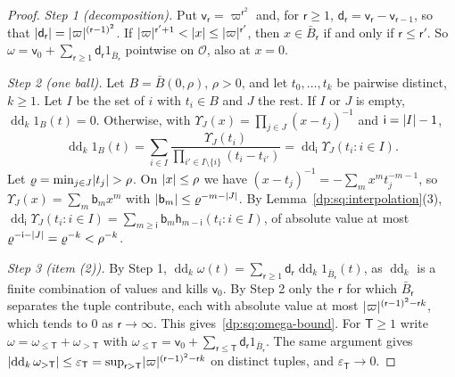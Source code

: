 \begin{proof}
\emph{Step 1 (decomposition).} Put $\mathsf v_{\mathsf r}=\varpi^{\mathsf r^2}$ and, for $\mathsf r\ge1$, $\mathsf d_{\mathsf r}=\mathsf v_{\mathsf r}-\mathsf v_{\mathsf r-1}$, so that $\lvert \mathsf d_{\mathsf r}\rvert=\lvert \varpi\rvert^{(\mathsf r-1)^2}$. If $\lvert \varpi\rvert^{\mathsf r'+1}<\lvert x\rvert\le\lvert \varpi\rvert^{\mathsf r'}$, then $x\in\bar B_{\mathsf r}$ if and only if $\mathsf r\le\mathsf r'$. So $\omega=\mathsf v_0+\sum_{\mathsf r\ge1}\mathsf d_{\mathsf r}1_{\bar B_{\mathsf r}}$ pointwise on $\mathcal O$, also at $x=0$.

\emph{Step 2 (one ball).} Let $B=\bar B(0,\rho)$, $\rho>0$, and let $t_0,\dots,t_k$ be pairwise distinct, $k\ge1$. Let $I$ be the set of $i$ with $t_i\in B$ and $J$ the rest. If $I$ or $J$ is empty, $\operatorname{dd}_k1_B(t)=0$. Otherwise, with $\Upsilon_J(x)=\prod_{j\in J}(x-t_j)^{-1}$ and $\mathsf i=\lvert I\rvert-1$,
\[
 \operatorname{dd}_k1_B(t)=\sum_{i\in I}\frac{\Upsilon_J(t_i)}{\prod_{i'\in I\setminus\{i\}}(t_i-t_{i'})}=\operatorname{dd}_{\mathsf i}\Upsilon_J(t_i:i\in I).
\]
Let $\varrho=\min_{j\in J}\lvert t_j\rvert>\rho$. On $\lvert x\rvert\le\rho$ we have $(x-t_j)^{-1}=-\sum_mx^mt_j^{-m-1}$, so $\Upsilon_J(x)=\sum_m\mathsf b_mx^m$ with $\lvert \mathsf b_m\rvert\le\varrho^{-m-\lvert J\rvert}$. By Lemma~\ref{dp:sq:interpolation}(3), $\operatorname{dd}_{\mathsf i}\Upsilon_J(t_i:i\in I)=\sum_{m\ge\mathsf i}\mathsf b_m\mathsf h_{m-\mathsf i}(t_i:i\in I)$, of absolute value at most $\varrho^{-\mathsf i-\lvert J\rvert}=\varrho^{-k}<\rho^{-k}$.

\emph{Step 3 (item (2)).} By Step 1, $\operatorname{dd}_k\omega(t)=\sum_{\mathsf r\ge1}\mathsf d_{\mathsf r}\operatorname{dd}_k1_{\bar B_{\mathsf r}}(t)$, as $\operatorname{dd}_k$ is a finite combination of values and kills $\mathsf v_0$. By Step 2 only the $\mathsf r$ for which $\bar B_{\mathsf r}$ separates the tuple contribute, each with absolute value at most $\lvert \varpi\rvert^{(\mathsf r-1)^2-\mathsf rk}$, which tends to $0$ as $\mathsf r\to\infty$. This gives~\eqref{dp:sq:omega-bound}. For $\mathsf T\ge1$ write $\omega=\omega_{\le\mathsf T}+\omega_{>\mathsf T}$ with $\omega_{\le\mathsf T}=\mathsf v_0+\sum_{\mathsf r\le\mathsf T}\mathsf d_{\mathsf r}1_{\bar B_{\mathsf r}}$. The same argument gives $\lvert \operatorname{dd}_k\omega_{>\mathsf T}\rvert\le\varepsilon_{\mathsf T}=\sup_{\mathsf r>\mathsf T}\lvert \varpi\rvert^{(\mathsf r-1)^2-\mathsf rk}$ on distinct tuples, and $\varepsilon_{\mathsf T}\to0$.


\end{proof}
